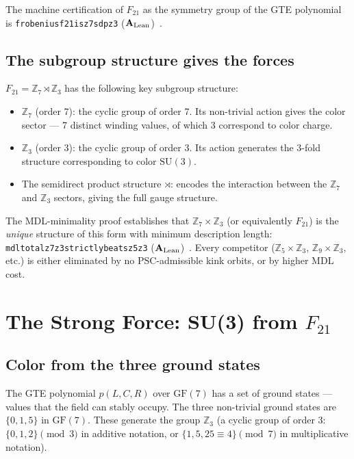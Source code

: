 \documentclass[11pt,a4paper]{article}
\newcommand{\lean}[1]{%
  \penalty-100
  \begingroup\def\_{\textunderscore\allowbreak}\texttt{#1}\endgroup}
\newcommand{\CatAL}{\ensuremath{\mathbf{A}_{\rm Lean}}}
\begin{document}
The machine certification of $F_{21}$ as the symmetry group of the GTE polynomial
is \lean{frobenius\_f21\_is\_z7\_sdp\_z3} (\CatAL)~\cite{SpivackGTECompleteFramework}.

\subsection{The subgroup structure gives the forces}

$F_{21} = \mathbb{Z}_7 \rtimes \mathbb{Z}_3$ has the following key subgroup structure:
\begin{itemize}[itemsep=2pt]
  \item $\mathbb{Z}_7$ (order 7): the cyclic group of order 7.
        Its non-trivial action gives the color sector --- 7 distinct winding
        values, of which 3 correspond to color charge.
  \item $\mathbb{Z}_3$ (order 3): the cyclic group of order 3.
        Its action generates the 3-fold structure corresponding to color $\mathrm{SU}(3)$.
  \item The semidirect product structure $\rtimes$: encodes the interaction
        between the $\mathbb{Z}_7$ and $\mathbb{Z}_3$ sectors, giving the
        full gauge structure.
\end{itemize}

The MDL-minimality proof establishes that $\mathbb{Z}_7 \times \mathbb{Z}_3$
(or equivalently $F_{21}$) is the \emph{unique} structure of this form
with minimum description length:
\lean{mdl\_total\_z7z3\_strictly\_beats\_z5z3} (\CatAL)~\cite{SpivackGTECompleteFramework}.
Every competitor ($\mathbb{Z}_5 \times \mathbb{Z}_3$, $\mathbb{Z}_9 \times \mathbb{Z}_3$,
etc.) is either eliminated by no PSC-admissible kink orbits, or by higher MDL cost.

\section{The Strong Force: SU(3) from $F_{21}$}
\label{sec:strong}

\subsection{Color from the three ground states}

The GTE polynomial $p(L,C,R)$ over $\mathrm{GF}(7)$ has a set of ground states ---
values that the field can stably occupy.
The three non-trivial ground states are $\{0, 1, 5\}$ in $\mathrm{GF}(7)$.
These generate the group $\mathbb{Z}_3$ (a cyclic group of order 3: $\{0, 1, 2\} \pmod{3}$
in additive notation, or $\{1, 5, 25 \equiv 4\} \pmod{7}$ in multiplicative notation).
\end{document}
